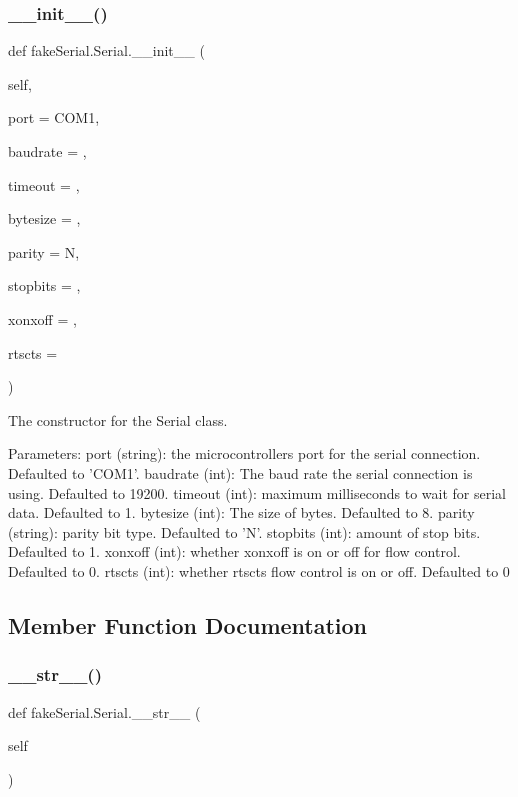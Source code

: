 \subsubsection{\texorpdfstring{\_\_init\_\_()}{\_\_init\_\_()}}
{\footnotesize\ttfamily def fake\+Serial.\+Serial.\+\_\+\+\_\+init\+\_\+\+\_\+ (\begin{DoxyParamCaption}\item[{}]{self,  }\item[{}]{port = {\ttfamily \textquotesingle{}COM1\textquotesingle{}},  }\item[{}]{baudrate = {},  }\item[{}]{timeout = {},  }\item[{}]{bytesize = {},  }\item[{}]{parity = {\ttfamily \textquotesingle{}N\textquotesingle{}},  }\item[{}]{stopbits = {},  }\item[{}]{xonxoff = {},  }\item[{}]{rtscts = {} }\end{DoxyParamCaption})}

\begin{DoxyVerb}The constructor for the Serial class.

Parameters:
    port (string): the microcontrollers port for the serial connection. Defaulted to 'COM1'.
    baudrate (int): The baud rate the serial connection is using. Defaulted to 19200.
    timeout (int): maximum milliseconds to wait for serial data. Defaulted to 1.
    bytesize (int): The size of bytes. Defaulted to 8.
    parity (string): parity bit type. Defaulted to 'N'.
    stopbits (int): amount of stop bits. Defaulted to 1.
    xonxoff (int): whether xonxoff is on or off for flow control. Defaulted to 0.
    rtscts (int): whether rtscts flow control is on or off. Defaulted to 0
\end{DoxyVerb}
 

\subsection{Member Function Documentation}
\mbox{\label{classfake_serial_1_1_serial_a597b04385c851077ccc3363f4bfb32c1}} 
\subsubsection{\texorpdfstring{\_\_str\_\_()}{\_\_str\_\_()}}
{\footnotesize\ttfamily def fake\+Serial.\+Serial.\+\_\+\+\_\+str\+\_\+\+\_\+ (\begin{DoxyParamCaption}\item[{}]{self }\end{DoxyParamCaption})}

